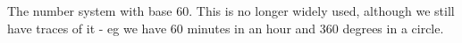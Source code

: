 The number system with base 60. This is no longer widely used,
although we still have traces of it - eg we have 60 minutes in
an hour and 360 degrees in a circle.